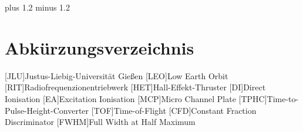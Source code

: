 \documentclass[fontsize=11pt,%
twoside,
BCOR          = 8mm]{scrreprt}
\author{Lorenz Saalmann}
\begin{document}
\font plus 1.2\font
minus 1.2\font






\cleardoublepage

\tableofcontents
\cleardoublepage

\listoffigures
\listoftables
\section*{\LARGE Abkürzungsverzeichnis}
\begin{acronym}
[JLU]{\dotfill Justus-Liebig-Universit\"{a}t Gie{\ss}en}
[LEO]{\dotfill Low Earth Orbit}
[RIT]{\dotfill Radiofrequenzionentriebwerk}
[HET]{\dotfill Hall-Effekt-Thruster}
[DI]{\dotfill Direct Ionisation}
[EA]{\dotfill Excitation Ionisation}
[MCP]{\dotfill Micro Channel Plate}
[TPHC]{\dotfill Time-to-Pulse-Height-Converter}
[TOF]{\dotfill Time-of-Flight}
[CFD]{\dotfill Constant Fraction Discriminator}
[FWHM]{\dotfill Full Width at Half Maximum}

\end{acronym}
\cleardoublepage

\onehalfspacing

\cleardoublepage


\cleardoublepage

\cleardoublepage

\cleardoublepage

\cleardoublepage

\cleardoublepage


\fontsize{12pt}{12pt}\selectfont

\renewcommand\bibname{Literaturverzeichnis}
\clearpage
{}
{}

\printbibliography
\end{document}
